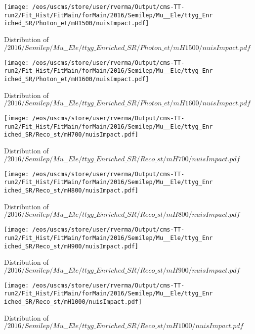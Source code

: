 \begin{figure}
\centering
\texttt{[image: /eos/uscms/store/user/rverma/Output/cms-TT-run2/Fit\_Hist/FitMain/forMain/2016/Semilep/Mu\_\_Ele/ttyg\_Enriched\_SR/Photon\_et/mH1500/nuisImpact.pdf]}
\caption{Distribution of $/2016/Semilep/Mu\_\_Ele/ttyg\_Enriched\_SR/Photon\_et/mH1500/nuisImpact.pdf$}
\end{figure}

\begin{figure}
\centering
\texttt{[image: /eos/uscms/store/user/rverma/Output/cms-TT-run2/Fit\_Hist/FitMain/forMain/2016/Semilep/Mu\_\_Ele/ttyg\_Enriched\_SR/Photon\_et/mH1600/nuisImpact.pdf]}
\caption{Distribution of $/2016/Semilep/Mu\_\_Ele/ttyg\_Enriched\_SR/Photon\_et/mH1600/nuisImpact.pdf$}
\end{figure}

\begin{figure}
\centering
\texttt{[image: /eos/uscms/store/user/rverma/Output/cms-TT-run2/Fit\_Hist/FitMain/forMain/2016/Semilep/Mu\_\_Ele/ttyg\_Enriched\_SR/Reco\_st/mH700/nuisImpact.pdf]}
\caption{Distribution of $/2016/Semilep/Mu\_\_Ele/ttyg\_Enriched\_SR/Reco\_st/mH700/nuisImpact.pdf$}
\end{figure}

\begin{figure}
\centering
\texttt{[image: /eos/uscms/store/user/rverma/Output/cms-TT-run2/Fit\_Hist/FitMain/forMain/2016/Semilep/Mu\_\_Ele/ttyg\_Enriched\_SR/Reco\_st/mH800/nuisImpact.pdf]}
\caption{Distribution of $/2016/Semilep/Mu\_\_Ele/ttyg\_Enriched\_SR/Reco\_st/mH800/nuisImpact.pdf$}
\end{figure}

\begin{figure}
\centering
\texttt{[image: /eos/uscms/store/user/rverma/Output/cms-TT-run2/Fit\_Hist/FitMain/forMain/2016/Semilep/Mu\_\_Ele/ttyg\_Enriched\_SR/Reco\_st/mH900/nuisImpact.pdf]}
\caption{Distribution of $/2016/Semilep/Mu\_\_Ele/ttyg\_Enriched\_SR/Reco\_st/mH900/nuisImpact.pdf$}
\end{figure}

\begin{figure}
\centering
\texttt{[image: /eos/uscms/store/user/rverma/Output/cms-TT-run2/Fit\_Hist/FitMain/forMain/2016/Semilep/Mu\_\_Ele/ttyg\_Enriched\_SR/Reco\_st/mH1000/nuisImpact.pdf]}
\caption{Distribution of $/2016/Semilep/Mu\_\_Ele/ttyg\_Enriched\_SR/Reco\_st/mH1000/nuisImpact.pdf$}
\end{figure}

